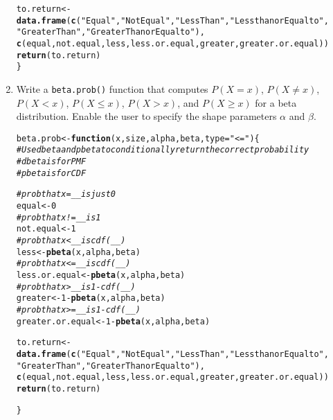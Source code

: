 \documentclass{article}\usepackage[]{graphicx}\usepackage[]{xcolor}
\makeatletter
\newcommand{\hlnum}[1]{\textcolor[rgb]{0.686,0.059,0.569}{#1}}%
\newcommand{\hlsng}[1]{\textcolor[rgb]{0.192,0.494,0.8}{#1}}%
\newcommand{\hlcom}[1]{\textcolor[rgb]{0.678,0.584,0.686}{\textit{#1}}}%
\newcommand{\hlopt}[1]{\textcolor[rgb]{0,0,0}{#1}}%
\newcommand{\hldef}[1]{\textcolor[rgb]{0.345,0.345,0.345}{#1}}%
\newcommand{\hlkwa}[1]{\textcolor[rgb]{0.161,0.373,0.58}{\textbf{#1}}}%
\newcommand{\hlkwb}[1]{\textcolor[rgb]{0.69,0.353,0.396}{#1}}%
\newcommand{\hlkwc}[1]{\textcolor[rgb]{0.333,0.667,0.333}{#1}}%
\newcommand{\hlkwd}[1]{\textcolor[rgb]{0.737,0.353,0.396}{\textbf{#1}}}%
\newenvironment{kframe}{%
 \def\at@end@of@kframe{}%
 \ifinner\ifhmode%
  \def\at@end@of@kframe{\end{minipage}}%
  \begin{minipage}{\columnwidth}%
 \fi\fi%
 \def\FrameCommand##1{\hskip\@totalleftmargin \hskip-\fboxsep
 \colorbox{shadecolor}{##1}\hskip-\fboxsep
     \hskip-\linewidth \hskip-\@totalleftmargin \hskip\columnwidth}%
 \MakeFramed {\advance\hsize-\width
   \@totalleftmargin\z@ \linewidth\hsize
   \@setminipage}}%
 {\par\unskip\endMakeFramed%
 \at@end@of@kframe}
\newenvironment{knitrout}{}{} %
\makeatother
\begin{document}
\begin{enumerate}
\begin{knitrout}
\begin{kframe}
\begin{alltt}
  \hldef{to.return} \hlkwb{<-} \hlkwd{data.frame}\hldef{(}\hlkwd{c}\hldef{(}\hlsng{"Equal"}\hldef{,} \hlsng{"Not Equal"}\hldef{,} \hlsng{"Less Than"}\hldef{,} \hlsng{"Less than or Equal to"}\hldef{,}
                            \hlsng{"Greater Than"}\hldef{,} \hlsng{"Greater Than or Equal to"}\hldef{),}
                          \hlkwd{c}\hldef{(equal,not.equal,less,less.or.equal,greater,greater.or.equal))}
  \hlkwd{return}\hldef{(to.return)}
\hldef{\}}
\end{alltt}
\end{kframe}
\end{knitrout}
    \item Write a \texttt{beta.prob()} function that computes $P(X=x)$, 
    $P(X \neq x)$, $P(X<x)$, $P(X \leq x)$, $P(X > x)$, and $P(X \geq x)$
    for a beta distribution. Enable the user to specify the shape parameters
    $\alpha$ and $\beta$.
\begin{knitrout}\scriptsize
{}\color{fgcolor}\begin{kframe}
\begin{alltt}
\hldef{beta.prob} \hlkwb{<-} \hlkwa{function}\hldef{(}\hlkwc{x}\hldef{,} \hlkwc{size}\hldef{,} \hlkwc{alpha}\hldef{,} \hlkwc{beta}\hldef{,} \hlkwc{type}\hldef{=}\hlsng{"<="}\hldef{)\{}
  \hlcom{# Use dbeta and pbeta to conditionally return the correct probability}
  \hlcom{#dbeta is for PMF}
  \hlcom{#pbeta is for CDF}

  \hlcom{#prob that x=__ is just 0}
  \hldef{equal} \hlkwb{<-}\hlnum{0}
  \hlcom{#prob that x!=__ is 1}
  \hldef{not.equal} \hlkwb{<-} \hlnum{1}
  \hlcom{#prob that x<__ is cdf(__)}
  \hldef{less} \hlkwb{<-} \hlkwd{pbeta}\hldef{(x,alpha,beta)}
  \hlcom{#prob that x <= __ is cdf(__)}
  \hldef{less.or.equal} \hlkwb{<-} \hlkwd{pbeta}\hldef{(x,alpha,beta)}
  \hlcom{#prob that x> __ is 1-cdf(__)}
  \hldef{greater} \hlkwb{<-} \hlnum{1}\hlopt{-} \hlkwd{pbeta}\hldef{(x,alpha,beta)}
  \hlcom{#prob that x>= __ is 1-cdf(__)}
  \hldef{greater.or.equal} \hlkwb{<-} \hlnum{1}\hlopt{-}\hlkwd{pbeta}\hldef{(x,alpha,beta)}

  \hldef{to.return} \hlkwb{<-} \hlkwd{data.frame}\hldef{(}\hlkwd{c}\hldef{(}\hlsng{"Equal"}\hldef{,} \hlsng{"Not Equal"}\hldef{,} \hlsng{"Less Than"}\hldef{,} \hlsng{"Less than or Equal to"}\hldef{,}
                            \hlsng{"Greater Than"}\hldef{,} \hlsng{"Greater Than or Equal to"}\hldef{),}
                          \hlkwd{c}\hldef{(equal,not.equal,less,less.or.equal,greater,greater.or.equal))}
  \hlkwd{return}\hldef{(to.return)}

\hldef{\}}
\end{alltt}
\end{kframe}
\end{knitrout}
\end{enumerate}

\end{document}
